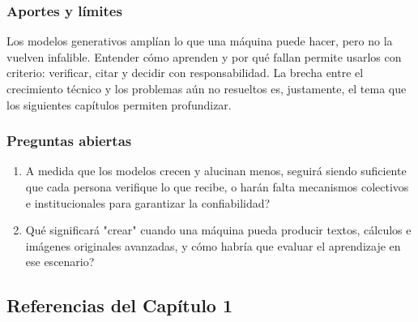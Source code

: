 \subsubsection*{Aportes y límites}
Los modelos generativos amplían lo que una máquina puede hacer, pero no la vuelven infalible. Entender cómo aprenden y por qué fallan permite usarlos con criterio: verificar, citar y decidir con responsabilidad. La brecha entre el crecimiento técnico y los problemas aún no resueltos es, justamente, el tema que los siguientes capítulos permiten profundizar.

\subsubsection*{Preguntas abiertas}
\begin{enumerate}
    \item A medida que los modelos crecen y alucinan menos, \textquestiondown seguirá siendo suficiente que cada persona verifique lo que recibe, o harán falta mecanismos colectivos e institucionales para garantizar la confiabilidad?
    \item \textquestiondown Qué significará "crear" cuando una máquina pueda producir textos, cálculos e imágenes originales avanzadas, y cómo habría que evaluar el aprendizaje en ese escenario?
\end{enumerate}

\newpage
{}
\subsection*{Referencias del Capítulo 1}

